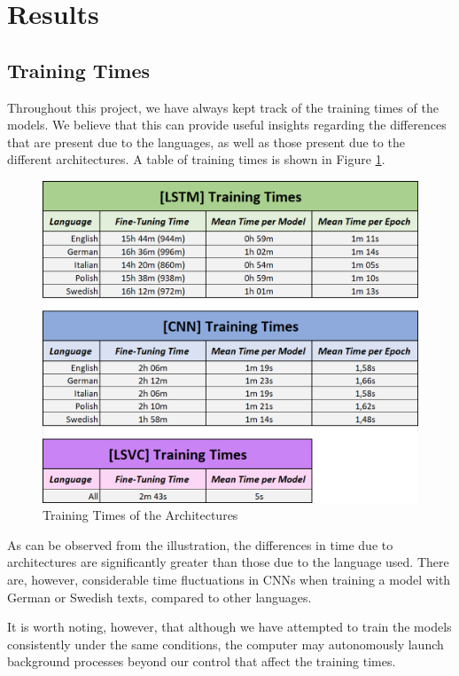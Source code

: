\documentclass[letterpaper,11pt]{article}
\begin{document}
\section{Results}
\label{sec:results}

\subsection{Training Times}

Throughout this project, we have always kept track of the training times of the models. We believe that this can provide useful insights regarding the differences that are present due to the languages, as well as those present due to the different architectures. A table of training times is shown in Figure \ref{fig:training_times}.

\begin{figure}[H]
  \centering
  \includegraphics[width=12.7cm]{fine_tuning_times.png}
  \caption{Training Times of the Architectures}
  \label{fig:training_times}
\end{figure}

As can be observed from the illustration, the differences in time due to architectures are significantly greater than those due to the language used. There are, however, considerable time fluctuations in CNNs when training a model with German or Swedish texts, compared to other languages. 

It is worth noting, however, that although we have attempted to train the models consistently under the same conditions, the computer may autonomously launch background processes beyond our control that affect the training times.
\end{document}
